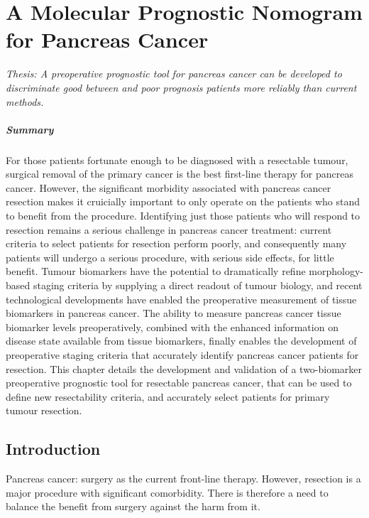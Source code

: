 \documentclass[dissertation.tex]{subfiles}
\begin{document}
\chapter{A Molecular Prognostic Nomogram for Pancreas Cancer}
\label{chap:nomogram}

\emph{Thesis: A preoperative prognostic tool for pancreas cancer can be developed to discriminate good between and poor prognosis patients more reliably than current methods.}

\paragraph{Summary}
For those patients fortunate enough to be diagnosed with a resectable tumour, surgical removal of the primary cancer is the best first-line therapy for pancreas cancer.  However, the significant morbidity associated with pancreas cancer resection makes it cruicially important to only operate on the patients who stand to benefit from the procedure.  Identifying just those patients who will respond to resection remains a serious challenge in pancreas cancer treatment: current criteria to select patients for resection perform poorly, and consequently many patients will undergo a serious procedure, with serious side effects, for little benefit.  Tumour biomarkers have the potential to dramatically refine morphology-based staging criteria by supplying a direct readout of tumour biology, and recent technological developments have enabled the preoperative measurement of tissue biomarkers in pancreas cancer.  The ability to measure pancreas cancer tissue biomarker levels preoperatively, combined with the enhanced information on disease state available from tissue biomarkers, finally enables the development of preoperative staging criteria that accurately identify pancreas cancer patients for resection.  This chapter details the development and validation of a two-biomarker preoperative prognostic tool for resectable pancreas cancer, that can be used to define new resectability criteria, and accurately select patients for primary tumour resection.

\section{Introduction}


Pancreas cancer: surgery as the current front-line therapy.  However, resection is a major procedure with significant comorbidity.  There is therefore a need to balance the benefit from surgery against the harm from it.
\end{document}
